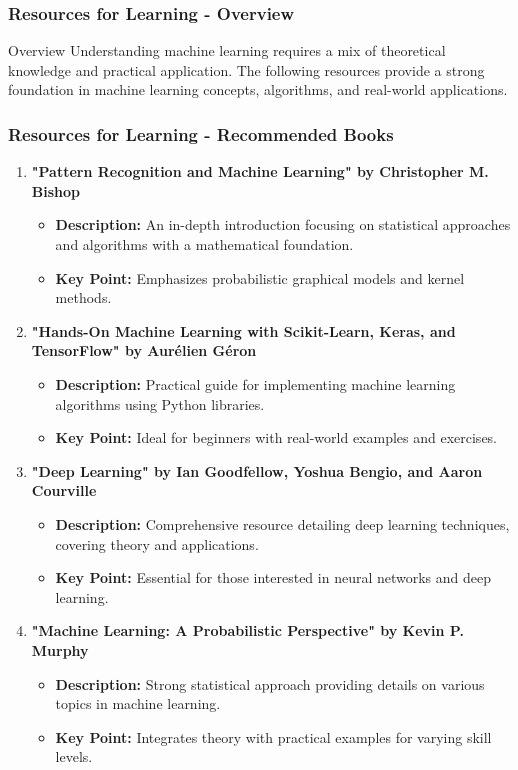 \documentclass[aspectratio=169]{beamer}
\begin{document}
\begin{frame}[fragile]
    \frametitle{Resources for Learning - Overview}
    \begin{block}{Overview}
        Understanding machine learning requires a mix of theoretical knowledge and practical application. The following resources provide a strong foundation in machine learning concepts, algorithms, and real-world applications.
    \end{block}
\end{frame}

\begin{frame}[fragile]
    \frametitle{Resources for Learning - Recommended Books}
    \begin{enumerate}
        \item \textbf{"Pattern Recognition and Machine Learning" by Christopher M. Bishop}
        \begin{itemize}
            \item \textbf{Description:} An in-depth introduction focusing on statistical approaches and algorithms with a mathematical foundation.
            \item \textbf{Key Point:} Emphasizes probabilistic graphical models and kernel methods.
        \end{itemize}
        
        \item \textbf{"Hands-On Machine Learning with Scikit-Learn, Keras, and TensorFlow" by Aurélien Géron}
        \begin{itemize}
            \item \textbf{Description:} Practical guide for implementing machine learning algorithms using Python libraries.
            \item \textbf{Key Point:} Ideal for beginners with real-world examples and exercises.
        \end{itemize}
        
        \item \textbf{"Deep Learning" by Ian Goodfellow, Yoshua Bengio, and Aaron Courville}
        \begin{itemize}
            \item \textbf{Description:} Comprehensive resource detailing deep learning techniques, covering theory and applications.
            \item \textbf{Key Point:} Essential for those interested in neural networks and deep learning.
        \end{itemize}
        
        \item \textbf{"Machine Learning: A Probabilistic Perspective" by Kevin P. Murphy}
        \begin{itemize}
            \item \textbf{Description:} Strong statistical approach providing details on various topics in machine learning.
            \item \textbf{Key Point:} Integrates theory with practical examples for varying skill levels.
        \end{itemize}
    \end{enumerate}
\end{frame}
\end{document}
